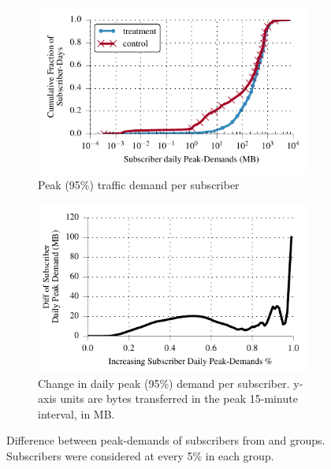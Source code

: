 \begin{figure}[t]
\begin{minipage}{1\linewidth}
\centering
\begin{subfigure}[b]{1\linewidth}
 \includegraphics[width=\linewidth]{figures/cdf_peak_demand-daily.pdf}
                \caption{Peak (95\%) traffic demand per subscriber\label{fig:CDF-data-rate-daily-perc95}}
 \end{subfigure}
\begin{subfigure}[b]{.99\linewidth}
\includegraphics[width=\linewidth]{figures/diff_perc95_bytes_subsc-daily-overall_01.pdf}		%
                \caption{Change in daily peak (95\%) demand per subscriber. 
		  y-axis units are bytes transferred in the peak 15-minute
                  interval, in MB.\label{fig:diff-peak-daily}} 
\end{subfigure}
%
\end{minipage}
  \caption{Difference between peak-demands of subscribers from \treatment{} and
  \control{} groups. Subscribers were considered at every 5\% in each
  group. 
  \label{fig:traffic-demand-daily}}
\end{figure}


